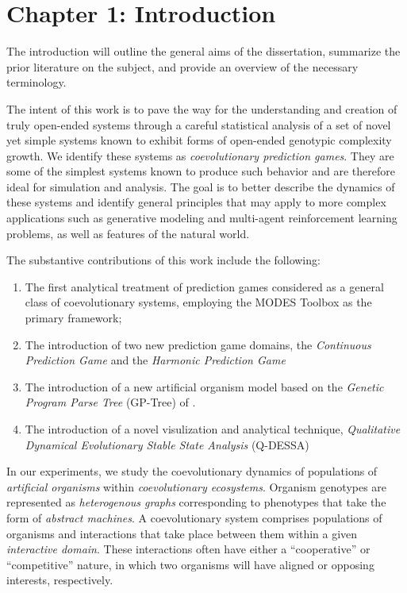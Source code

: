 \documentclass{article}
\begin{document}
\section*{Chapter 1: Introduction}
The introduction will outline the general aims of the dissertation, summarize the prior 
literature on the subject, and provide an overview of the necessary terminology.

The intent of this work is to pave the way for the understanding and creation of truly open-ended systems 
through a careful statistical analysis of a set of novel yet simple systems known to exhibit forms of
open-ended genotypic complexity growth. We identify
these systems as \textit{coevolutionary prediction games}. They are some of the simplest systems
known to produce such behavior and are therefore ideal for simulation and analysis. The goal is 
to better describe the dynamics of these systems and identify general principles that may apply
to more complex applications such as generative modeling and multi-agent reinforcement learning problems,
as well as features of the natural world.

The substantive contributions of this work include the following:
\begin{enumerate}
    \item The first analytical treatment of prediction games considered as a general class of 
        coevolutionary systems, employing the MODES Toolbox as the primary framework;
    \item The introduction of two new prediction game domains, the \textit{Continuous Prediction Game}
        and the \textit{Harmonic Prediction Game}
    \item The introduction of a new artificial organism model based on the \textit{Genetic Program Parse Tree}
        (GP-Tree) of \citet{Koza92}.
    \item The introduction of a novel visulization and analytical technique, 
        \textit{Qualitative Dynamical Evolutionary Stable State Analysis} (Q-DESSA)
\end{enumerate}

In our experiments, we study the coevolutionary dynamics of populations of 
\textit{artificial organisms} within \textit{coevolutionary ecosystems}.
Organism genotypes are represented as \textit{heterogenous graphs} corresponding to phenotypes
that take the form of \textit{abstract machines}. A coevolutionary system comprises populations
of organisms and interactions that take place between them within a given \textit{interactive domain}.
These interactions often have either a ``cooperative'' or ``competitive'' nature, in which two
organisms will have aligned or opposing interests, respectively.
\end{document}
